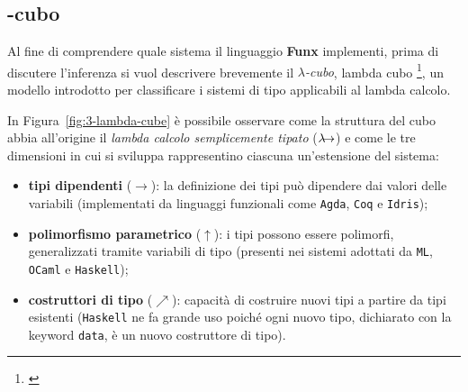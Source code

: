 \subsection{\texorpdfstring{\textlambda}{lambda}-cubo}
\label{sec:3-2-lambda-cube}

Al fine di comprendere quale sistema il linguaggio \textbf{Funx} implementi,
prima di discutere l'inferenza si vuol descrivere brevemente il \textit{$\lambda$-cubo}, lambda cubo%
\footnote{ \cite{Barendregt-1991-GeneralizedSystems}},
un modello introdotto per classificare i sistemi di tipo applicabili al lambda calcolo.

\noindent In Figura~\ref{fig:3-lambda-cube} è possibile osservare come la struttura del cubo abbia all'origine
il \textit{lambda calcolo semplicemente tipato} ($\lambda\mkern-9mu\rightarrow$) e come le tre dimensioni
in cui si sviluppa rappresentino ciascuna un'estensione del sistema:
\begin{itemize}
    \item \textbf{tipi dipendenti} ($\rightarrow$): la definizione dei tipi può dipendere dai valori delle variabili
          (implementati da linguaggi funzionali come \texttt{Agda}, \texttt{Coq} e \texttt{Idris});
    \item \textbf{polimorfismo parametrico} ($\uparrow$): i tipi possono essere polimorfi, generalizzati
          tramite variabili di tipo (presenti nei sistemi adottati da \texttt{ML}, \texttt{OCaml} e \texttt{Haskell});
    \item \textbf{costruttori di tipo} ($\nearrow$): capacità di costruire nuovi tipi a partire da tipi esistenti
          (\texttt{Haskell} ne fa grande uso poiché ogni nuovo tipo,
          dichiarato con la keyword \texttt{data}, è un nuovo costruttore di tipo).
\end{itemize}

